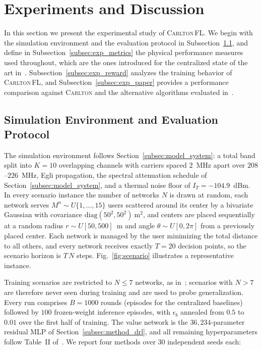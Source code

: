 \documentclass[journal]{IEEEtran}
\newcommand{\CARLTON}{\textsc{Carlton}}
\newcommand{\OURS}{\textsc{Carlton\,FL}}
\begin{document}
\section{Experiments and Discussion}
\label{sec:experiments}

In this section we present the experimental study of \OURS{}. We begin with the
simulation environment and the evaluation protocol in
Subsection~\ref{subsec:exp_setup}, and define in
Subsection~\ref{subsec:exp_metrics} the physical performance measures used
throughout, which are the ones introduced for the centralized state of the art
in~\cite{cohen2024carlton}. Subsection~\ref{subsec:exp_reward} analyzes the
training behavior of \OURS{}, and Subsection~\ref{subsec:exp_paper} provides a
performance comparison against \CARLTON{} and the alternative algorithms
evaluated in~\cite{cohen2024carlton}.

\subsection{Simulation Environment and Evaluation Protocol}
\label{subsec:exp_setup}

The simulation environment follows Section~\ref{subsec:model_system}: a total
band split into $K=10$ overlapping channels with carriers spaced $2$~MHz apart
over $208$--$226$~MHz, Egli propagation, the spectral attenuation schedule of
Section~\ref{subsec:model_system}, and a thermal noise floor of
$I_{T}=-104.9$~dBm. In every scenario instance the number of networks $N$ is
drawn at random, each network serves $M^{n}\sim U\{1,\dots,15\}$ users
scattered around its center by a bivariate Gaussian with covariance
$\mathrm{diag}(50^{2},50^{2})~\mathrm{m}^{2}$, and centers are placed
sequentially at a random radius $r\sim U[50,500]$~m and angle $\theta\sim
U[0,2\pi]$ from a previously placed center. Each network is managed by the user
minimizing the total distance to all others, and every network receives exactly
$T=20$ decision points, so the scenario horizon is $T\,N$ steps.
Fig.~\ref{fig:scenario} illustrates a representative instance.

Training scenarios are restricted to $N\leq 7$ networks, as
in~\cite{cohen2024carlton}; scenarios with $N>7$ are therefore never seen
during training and are used to probe generalization. Every run comprises
$B=1000$ rounds (episodes for the centralized baselines) followed by $100$
frozen-weight inference episodes, with $\epsilon_{b}$ annealed from $0.5$ to
$0.01$ over the first half of training. The value network is the
$36{,}234$-parameter residual MLP of Section~\ref{subsec:method_drl}, and all
remaining hyperparameters follow Table~II of~\cite{cohen2024carlton}. We report
four methods over $30$ independent seeds each:
\end{document}
